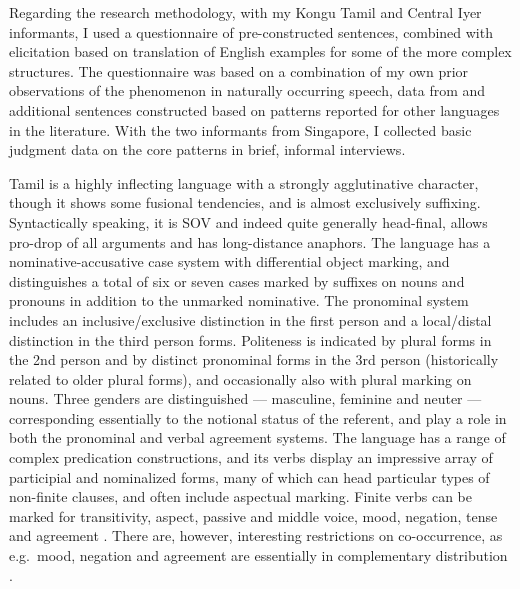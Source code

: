 \documentclass[output=paper, modfonts, nonflat]{langsci/langscibook}
\begin{document}
Regarding the research methodology, with my Kongu Tamil and Central
Iyer informants, I used a questionnaire of pre-constructed sentences,
combined with elicitation based on translation of English examples for
some of the more complex structures. The questionnaire was based on a
combination of my own prior observations of the phenomenon in
naturally occurring speech, data from \citet{amrit:1991} and
additional sentences constructed based on patterns reported for other
languages in the literature. With the two informants from Singapore, I
collected basic judgment data on the core patterns in brief, informal
interviews.


Tamil is a highly inflecting language with a strongly agglutinative
character, though it shows some fusional tendencies, and is almost
exclusively suffixing. Syntactically speaking, it is SOV and indeed
quite generally head-final, allows pro-drop of all arguments and has
long-distance anaphors. The language has a nominative-accusative case
system with differential object marking, and distinguishes a total of
six or seven cases marked by suffixes on nouns and pronouns in
addition to the unmarked nominative. The pronominal system includes an
inclusive/exclusive distinction in the first person and a local/distal
distinction in the third person forms. Politeness is indicated by
plural forms in the 2nd person and by distinct pronominal forms in the
3rd person (historically related to older plural forms), and
occasionally also with plural marking on nouns. Three genders are
distinguished --- masculine, feminine and neuter --- corresponding
essentially to the notional status of the referent, and play a role in
both the pronominal and verbal agreement systems. The language has a
range of complex predication constructions, and its verbs display an
impressive array of participial and nominalized forms, many of which
can head particular types of non-finite clauses, and often include
aspectual marking. Finite verbs can be marked for transitivity,
aspect, passive and middle voice, mood, negation, tense and agreement
\citep[]{sundaresanmcfadden:tamtrans}. There are, however, interesting
restrictions on co-occurrence, as e.g.\ mood, negation and agreement
are essentially in complementary distribution
\citep[][]{amritjay:2005}.
\end{document}
